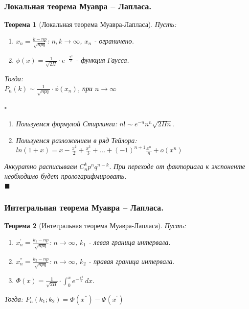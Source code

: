 \documentclass[14pt]{extarticle}
\theoremstyle{breakstyle}
\newtheorem{theorem}{Теорема}[subsection]
\begin{document}
\subsubsection{Локальная теорема Муавра – Лапласа.}
\begin{theorem}[Локальная теорема Муавра-Лапласа]

Пусть: 
\begin{enumerate}
    \item $x_{n} = \frac{k-np}{\sqrt{npq}}$: $n, k \rightarrow \infty$, $x_{n}$ - ограничено.
    \item $\phi(x) = \frac{1}{\sqrt{2\Pi}} \cdot e^{-\frac{x^{2}}{2}}$ - функция Гаусса.
\end{enumerate}

Тогда:\\
$P_{n}(k) \sim \frac{1}{\sqrt{npq}} \cdot \phi(x_{n})$, при $n \rightarrow \infty$

$\square$

\begin{enumerate}
    \item Пользуемся формулой Стирлинга: $n! \sim e^{-n}n^{n}\sqrt{2\Pi n}$.
    \item Пользуемся разложением в ряд Тейлора: $ln(1+x) = x - \frac{x^{2}}{2} + \frac{x^3}{3} + ... + (-1)^{n+1} \frac{x^{n}}{n} + o(x^{n})$
\end{enumerate}

Аккуратно расписываем $C_{n}^{k}p^{n}q^{n-k}$. При переходе от факториала к экспоненте необходимо будет прологарифмировать. \\

\hfill$\blacksquare$

\end{theorem}

\subsubsection{Интегральная теорема Муавра – Лапласа.}
\begin{theorem}[Интегральная теорема Муавра-Лапласа]

Пусть: 
\begin{enumerate}
    \item $x_{n}^{'} = \frac{k_{1}-np}{\sqrt{npq}}$: $n \rightarrow \infty$, $k_{1}$ - левая граница интервала.
    \item $x_{n}^{''} = \frac{k_{2}-np}{\sqrt{npq}}$: $n \rightarrow \infty$, $k_{2}$ - правая граница интервала.
    \item $\Phi(x) = \frac{1}{\sqrt{2\Pi}} \cdot \int_{0}^{x} e^{-\frac{x^{2}}{2}} \, dx$.
\end{enumerate}

Тогда:
$P_{n}(k_{1}; k_{2}) = \Phi(x^{''}) - \Phi(x^{'})$

\end{theorem}
\end{document}
